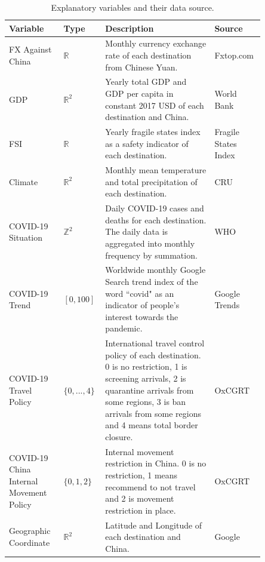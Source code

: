 \documentclass{article}
\begin{document}
\begin{table}[htbp]
\small
    \centering
        \begin{tabular}{p{0.2\linewidth} |p{0.1\linewidth} |p{0.4\linewidth} |p{0.15\linewidth}}
            Variable & Type & Description & Source \\
            \hline
            \hline
            FX Against China & $\mathbb{R}$ & Monthly currency exchange rate of each destination from Chinese Yuan. & Fxtop.com \cite{FXTop} \\
            \hline
            GDP & $\mathbb{R}^2$ & Yearly total GDP and GDP per capita in constant 2017 USD of each destination and China. & World Bank \cite{worldbank} \\   
            \hline
            FSI & $\mathbb{R}$ & Yearly fragile states index as a safety indicator of each destination. & Fragile States Index \cite{fsi} \\    
            \hline
            Climate & $\mathbb{R}^2$ & Monthly mean temperature and total precipitation of each destination. & CRU \cite{cru} \\    
            \hline
            COVID-19 Situation & $\mathbb{Z}^2$ & Daily COVID-19 cases and deaths for each destination. The daily data is aggregated into monthly frequency by summation. & WHO \cite{covidwho} \\    
            \hline
            COVID-19 Trend & $[0, 100]$ & Worldwide monthly Google Search trend index of the word ``covid" as an indicator of people's interest towards the pandemic. & Google Trends \cite{covidtrend} \\
            \hline
            COVID-19 Travel Policy & $\{0, ..., 4\}$ & International travel control policy of each destination. 0 is no restriction, 1 is screening arrivals, 2 is quarantine arrivals from some regions, 3 is ban arrivals from some regions and 4 means total border closure. & OxCGRT \cite{oxfordcovid} \\
            \hline
            COVID-19 China Internal Movement Policy & $\{0, 1, 2\}$ & Internal movement restriction in China. 0 is no restriction, 1 means recommend to not travel and 2 is movement restriction in place. & OxCGRT \cite{oxfordcovid} \\
            \hline
            Geographic Coordinate & $\mathbb{R}^2$ & Latitude and Longitude of each destination and China. & Google \\
        \end{tabular}
    \caption{Explanatory variables and their data source.}
    \label{table:expvar}
\end{table}
\end{document}
